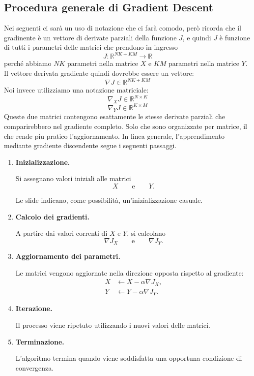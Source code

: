 \subsection{Procedura generale di Gradient Descent}
Nei seguenti ci sarà un uso di notazione che ci farà comodo, però ricorda che il gradinente è un vettore di derivate parziali della funzione $J$, e quindi $J$ è funzione di tutti i parametri delle matrici che prendono in ingresso
\[
J:\mathbb{R}^{NK+KM}\rightarrow\mathbb{R}
\]
perché abbiamo \(NK\) parametri nella matrice \(X\) e \(KM\) parametri nella matrice \(Y\).
Il vettore derivata gradiente quindi dovrebbe essere un vettore:
\[
\boxed{
\nabla J
\in\mathbb{R}^{NK+KM}
}
\]
Noi invece utilizziamo una notazione matriciale:
\[
\nabla_X J\in\mathbb{R}^{N\times K}
\]
\[
\nabla_Y J\in\mathbb{R}^{K\times M}
\]
Queste due matrici contengono esattamente le stesse derivate parziali che comparirebbero nel gradiente completo.
Solo che sono organizzate per matrice, il che rende piu pratico l'aggiornamento.
In linea generale, l'apprendimento mediante gradiente discendente segue i seguenti passaggi.

\begin{enumerate}
    \item \textbf{Inizializzazione.}

    Si assegnano valori iniziali alle matrici
    \[
    X
    \qquad\text{e}\qquad
    Y.
    \]

    Le slide indicano, come possibilità, un'inizializzazione casuale.

    \item \textbf{Calcolo dei gradienti.}

    A partire dai valori correnti di $X$ e $Y$, si calcolano
    \[
    \nabla J_X
    \qquad\text{e}\qquad
    \nabla J_Y.
    \]

    \item \textbf{Aggiornamento dei parametri.}

    Le matrici vengono aggiornate nella direzione opposta rispetto al gradiente:
    \begin{align*}
    X &\leftarrow X-\alpha\nabla J_X,\\
    Y &\leftarrow Y-\alpha\nabla J_Y.
    \end{align*}

    \item \textbf{Iterazione.}

    Il processo viene ripetuto utilizzando i nuovi valori delle matrici.

    \item \textbf{Terminazione.}

    L'algoritmo termina quando viene soddisfatta una opportuna condizione di convergenza.
\end{enumerate}

